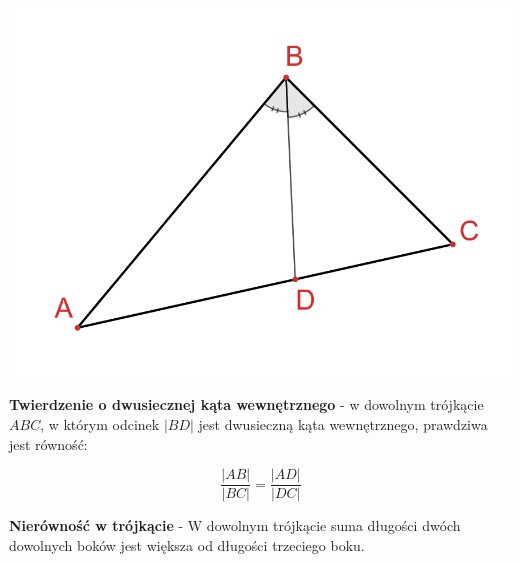 \documentclass[14pt,a4paper]{extarticle}
\begin{document}
\begin{center}\includegraphics[scale=0.5]{geometria/odcinki w trójkącie zdwusiecznionym.png}\end{center}
\noindent \textbf{Twierdzenie o dwusiecznej kąta wewnętrznego} - w dowolnym trójkącie $ABC$, w którym
odcinek $\vert BD\vert$ jest dwusieczną kąta wewnętrznego, prawdziwa jest równość:

$$\dfrac{\vert AB\vert}{\vert BC\vert} = \dfrac{\vert AD\vert}{\vert DC\vert}$$

\hfill\break {}
\noindent\textbf{\!\!Nierówność w trójkącie} - W dowolnym trójkącie suma długości dwóch dowolnych boków jest
większa od długości trzeciego boku.\MoveBelowBox\unskip
\end{document}
